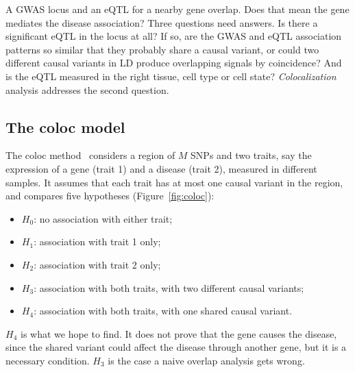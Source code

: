 A GWAS locus and an eQTL for a nearby gene overlap. Does that mean the gene mediates the disease association? Three questions need answers. Is there a significant eQTL in the locus at all? If so, are the GWAS and eQTL association patterns so similar that they probably share a causal variant, or could two different causal variants in LD produce overlapping signals by coincidence? And is the eQTL measured in the right tissue, cell type or cell state? \emph{Colocalization} analysis addresses the second question.

\subsection{The coloc model}

The coloc method~\citep{giambartolomei2014} considers a region of $M$ SNPs and two traits, say the expression of a gene (trait 1) and a disease (trait 2), measured in different samples. It assumes that each trait has at most one causal variant in the region, and compares five hypotheses (Figure~\ref{fig:coloc}):
\begin{itemize}
  \item $H_0$: no association with either trait;
  \item $H_1$: association with trait 1 only;
  \item $H_2$: association with trait 2 only;
  \item $H_3$: association with both traits, with two different causal variants;
  \item $H_4$: association with both traits, with one shared causal variant.
\end{itemize}
$H_4$ is what we hope to find. It does not prove that the gene causes the disease, since the shared variant could affect the disease through another gene, but it is a necessary condition. $H_3$ is the case a naive overlap analysis gets wrong.


